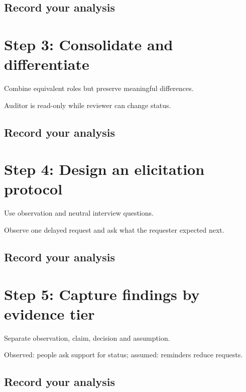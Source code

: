 \documentclass[11pt,letterpaper]{article}
\begin{document}
\subsection{Record your analysis}
\section{Step 3: Consolidate and differentiate}
Combine equivalent roles but preserve meaningful differences.

\begin{tcolorbox}[colback=tealback,colframe=navy,title={Illustration},breakable]
Auditor is read-only while reviewer can change status.

\end{tcolorbox}
\subsection{Record your analysis}
\section{Step 4: Design an elicitation protocol}
Use observation and neutral interview questions.

\begin{tcolorbox}[colback=tealback,colframe=navy,title={Illustration},breakable]
Observe one delayed request and ask what the requester expected next.

\end{tcolorbox}
\subsection{Record your analysis}
\section{Step 5: Capture findings by evidence tier}
Separate observation, claim, decision and assumption.

\begin{tcolorbox}[colback=tealback,colframe=navy,title={Illustration},breakable]
Observed: people ask support for status; assumed: reminders reduce requests.

\end{tcolorbox}
\subsection{Record your analysis}
\end{document}
